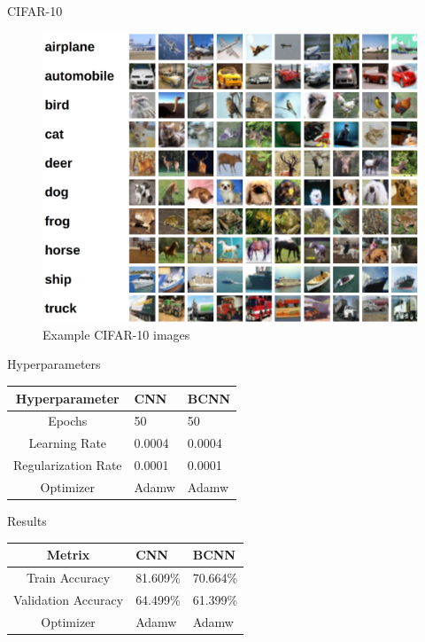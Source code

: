\documentclass{beamer}
\begin{document}
\begin{frame}{CIFAR-10}
	\begin{figure}
		\includegraphics[width=.65\textwidth]{../Images/cifar-10.png}
		\caption{Example CIFAR-10 images \cite{cifar10}}
	\end{figure}
\end{frame}

\begin{frame}{Hyperparameters}
	\centering
	\begin{tabular}{|c||p{3cm}|p{3cm}|} %
		\hline
		\textbf{Hyperparameter} & \textbf{CNN} & \textbf{BCNN} \\ [0.5ex] 
		\hline\hline
		Epochs & 50 & 50\\
		\hline
		Learning Rate & 0.0004  & 0.0004  \\
		\hline
		Regularization Rate& 0.0001 & 0.0001 \\
		\hline
		Optimizer & Adamw  & Adamw  \\
		\hline
	\end{tabular}
\end{frame}

\begin{frame}{Results}
	\centering
	\begin{tabular}{|c||p{3cm}|p{3cm}|} %
		\hline
		\textbf{Metrix} & \textbf{CNN} & \textbf{BCNN} \\ [0.5ex] 
		\hline\hline
		Train Accuracy & 81.609\% & 70.664\%\\
		\hline
		Validation Accuracy & 64.499\%  & 61.399\%  \\
		\hline
		Optimizer & Adamw  & Adamw  \\
		\hline
	\end{tabular}
\end{frame}
\end{document}
